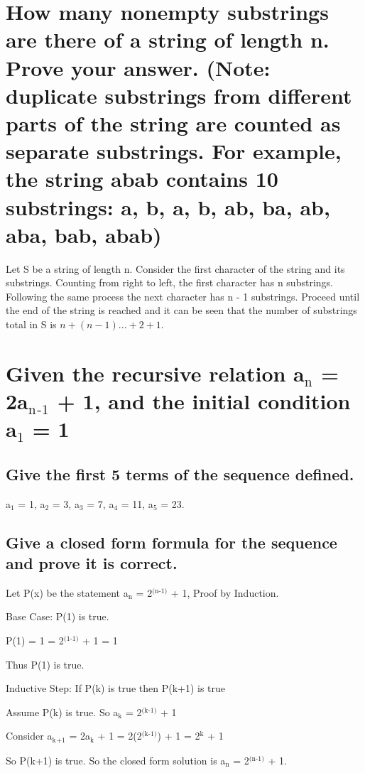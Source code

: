 \documentclass[11pt]{article}
\begin{document}
\section{How many nonempty substrings are there of a string of length n. Prove your answer. (Note: duplicate substrings from different parts of the string are counted as separate substrings. For example, the string abab contains 10 substrings: a, b, a, b, ab, ba, ab, aba, bab, abab)}
\label{sec:orgeca02f6}
\quad Let S be a string of length n. Consider the first character of the string and its substrings. Counting from right to left, the first character has n substrings. Following the same process the next character has n - 1 substrings. Proceed until the end of the string is reached and it can be seen that the number of substrings total in S is \(n + (n - 1) ... + 2 + 1\). 
\section{Given the recursive relation a\(_{\text{n}}\) = 2a\(_{\text{n}}\)\(_{\text{-1}}\) + 1, and the initial condition a\(_{\text{1}}\) = 1}
\label{sec:org7a0b76f}
\subsection{Give the first 5 terms of the sequence defined.}
\label{sec:orgf41d726}
\quad a\(_{\text{1}}\) = 1, a\(_{\text{2}}\) = 3, a\(_{\text{3}}\) = 7, a\(_{\text{4}}\) = 11, a\(_{\text{5}}\) = 23.
\subsection{Give a closed form formula for the sequence and prove it is correct.}
\label{sec:org2b836d8}
\quad Let P(x) be the statement a\(_{\text{n}}\) = 2\(^{\text{(n-1)}}\) + 1, Proof by Induction.\par
  Base Case: P(1) is true.\par
  P(1) = 1 = 2\(^{\text{(1-1)}}\) + 1 = 1\par
  Thus P(1) is true.\par
  Inductive Step: If P(k) is true then P(k+1) is true\par
  Assume P(k) is true. So a\(_{\text{k}}\) = 2\(^{\text{(k-1)}}\) + 1\par
  Consider a\(_{\text{k}}\)\(_{\text{+1}}\) = 2a\(_{\text{k}}\) + 1 = 2(2\(^{\text{(k-1)}}\)) + 1 = 2\(^{\text{k}}\) + 1\par
  So P(k+1) is true. So the closed form solution is a\(_{\text{n}}\) = 2\(^{\text{(n-1)}}\) + 1.
\end{document}

